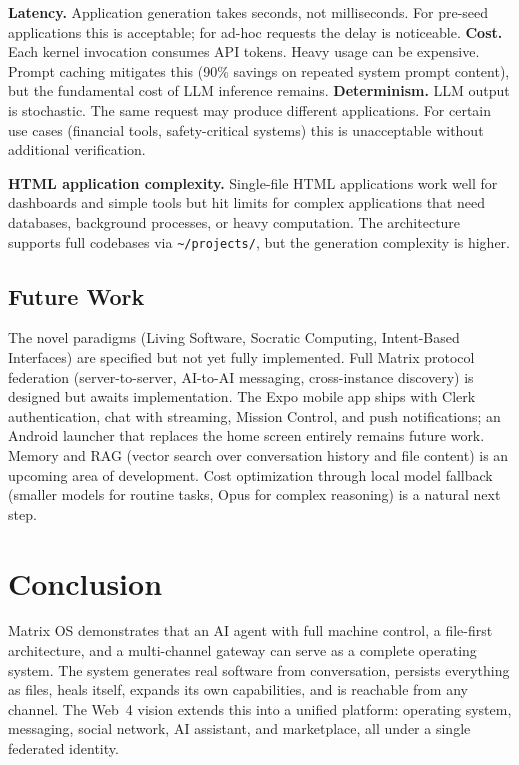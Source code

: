 \documentclass[11pt,a4paper]{article}
\begin{document}
\textbf{Latency.} Application generation takes seconds, not milliseconds. For pre-seed applications this is acceptable; for ad-hoc requests the delay is noticeable. \textbf{Cost.} Each kernel invocation consumes API tokens. Heavy usage can be expensive. Prompt caching mitigates this (90\% savings on repeated system prompt content), but the fundamental cost of LLM inference remains. \textbf{Determinism.} LLM output is stochastic. The same request may produce different applications. For certain use cases (financial tools, safety-critical systems) this is unacceptable without additional verification.

\textbf{HTML application complexity.} Single-file HTML applications work well for dashboards and simple tools but hit limits for complex applications that need databases, background processes, or heavy computation. The architecture supports full codebases via \texttt{\textasciitilde/projects/}, but the generation complexity is higher.

\subsection{Future Work}

The novel paradigms (Living Software, Socratic Computing, Intent-Based Interfaces) are specified but not yet fully implemented. Full Matrix protocol federation (server-to-server, AI-to-AI messaging, cross-instance discovery) is designed but awaits implementation. The Expo mobile app ships with Clerk authentication, chat with streaming, Mission Control, and push notifications; an Android launcher that replaces the home screen entirely remains future work. Memory and RAG (vector search over conversation history and file content) is an upcoming area of development. Cost optimization through local model fallback (smaller models for routine tasks, Opus for complex reasoning) is a natural next step.

\section{Conclusion}

Matrix OS demonstrates that an AI agent with full machine control, a file-first architecture, and a multi-channel gateway can serve as a complete operating system. The system generates real software from conversation, persists everything as files, heals itself, expands its own capabilities, and is reachable from any channel. The Web~4 vision extends this into a unified platform: operating system, messaging, social network, AI assistant, and marketplace, all under a single federated identity.
\end{document}
